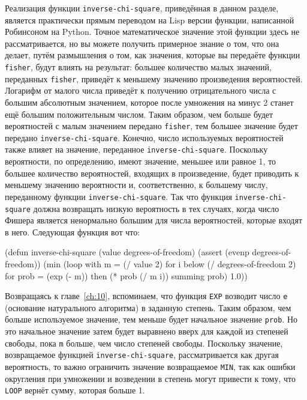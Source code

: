 Реализация функции \lstinline{inverse-chi-square}, приведённая в данном разделе, является
практически прямым переводом на Lisp версии функции, написанной Робинсоном на Python.
Точное математическое значение этой функции здесь не рассматривается, но вы можете
получить примерное знание о том, что она делает, путём размышления о том, как значения,
которые вы передаёте функции \lstinline{fisher}, будут влиять на результат: большее количество
малых значений, переданных \lstinline{fisher}, приведёт к меньшему значению произведения
вероятностей.  Логарифм от малого числа приведёт к получению отрицательного числа с
большим абсолютным значением, которое после умножения на минус 2 станет ещё большим
положительным числом.  Таким образом, чем больше будет вероятностей с малым значением
передано \lstinline{fisher}, тем большее значение будет передано
\lstinline{inverse-chi-square}. Конечно, число используемых вероятностей также влияет на
значение, переданное \lstinline{inverse-chi-square}.  Поскольку вероятности, по определению,
имеют значение, меньшее или равное 1, то большее количество вероятностей, входящих в
произведение, будет приводить к меньшему значению вероятности и, соответственно, к
большему числу, переданному функции \lstinline{inverse-chi-square}.  Так что функция
\lstinline{inverse-chi-square} должна возвращать низкую вероятность в тех случаях, когда число
Фишера является ненормально большим для числа вероятностей, которые входят в него.
Следующая функция вот что:

\begin{myverb}
(defun inverse-chi-square (value degrees-of-freedom)
  (assert (evenp degrees-of-freedom))
  (min 
   (loop with m = (/ value 2)
      for i below (/ degrees-of-freedom 2)
      for prob = (exp (- m)) then (* prob (/ m i))
      summing prob)
   1.0))
\end{myverb}

Возвращаясь к главе~\ref{ch:10}, вспоминаем, что функция \lstinline{EXP} возводит число
\lstinline{e} (основание натурального алгоритма) в заданную степень.  Таким образом, чем больше
используемое значение, тем меньше будет начальное значение \lstinline{prob}.  Но это начальное
значение затем будет выравнено вверх для каждой из степеней свободы, пока \lstinline{m} больше,
чем число степеней свободы.  Поскольку значение, возвращаемое функцией
\lstinline{inverse-chi-square}, рассматривается как другая вероятность, то важно ограничить
значение возвращаемое \lstinline{MIN}, так как ошибки округления при умножении и возведении в
степень могут привести к тому, что \lstinline{LOOP} вернёт сумму, которая больше 1.

